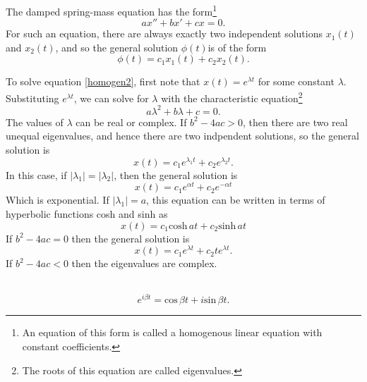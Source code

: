\documentclass[nobib,notoc]{tufte-handout}
\begin{document}
\begin{rema}
	The damped spring-mass equation has the form\footnote{An equation of this form is called a homogenous linear equation with constant coefficients.}
	\begin{equation*}
		ax''+bx'+cx=0.
	\end{equation*}
	For such an equation, there are always exactly two independent solutions \(x_1(t)\) and \(x_2(t)\), and so the general solution \(\phi(t)\)is of the form
	\begin{equation*}
		\phi(t)=c_1x_1(t)+c_2x_2(t).
	\end{equation*}
\end{rema}
\begin{defi}
	To solve equation \ref{homogen2}, first note that \(x(t)=e^{\lambda t}\) for some constant \(\lambda\). Substituting \(e^{\lambda t}\), we can solve for \(\lambda\) with the characteristic equation\footnote{The roots of this equation are called eigenvalues.}
	\begin{equation*}
		a\lambda^2+b\lambda+c=0.
	\end{equation*}
	The values of \(\lambda\) can be real or complex. If \(b^2-4ac>0\), then there are two real unequal eigenvalues, and hence there are two indpendent solutions, so the general solution is
	\begin{equation*}
		x(t)=c_1e^{\lambda_1 t}+c_2e^{\lambda_2 t}.
	\end{equation*}
	In this case, if \(\lvert\lambda_1\rvert=\lvert\lambda_2\rvert\), then the general solution is
	\begin{equation*}
		x(t)=c_1e^{\alpha t}+c_2e^{-\alpha t}
	\end{equation*}
	Which is exponential. If \(\lvert \lambda_1\rvert=a\), this equation can be written in terms of hyperbolic functions cosh and sinh as
	\begin{equation*}
		x(t)=c_1\text{cosh}\,at+c_2\text{sinh}\,at
	\end{equation*}
	If \(b^2-4ac=0\) then the general solution is
	\begin{equation*}
		x(t)=c_1e^{\lambda t}+c_2te^{\lambda t}.
	\end{equation*}
	If \(b^2-4ac<0\) then the eigenvalues are complex.
\end{defi}
\begin{defi}
	\,
	\begin{equation*}
		e^{i\beta t}=\text{cos}\,\beta t+i\text{sin}\,\beta t.
	\end{equation*}
\end{defi}
\end{document}
